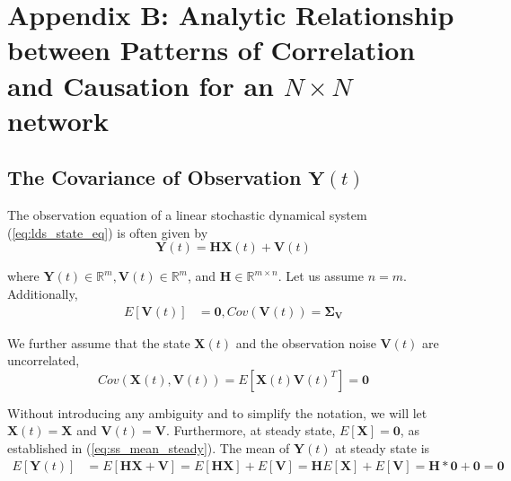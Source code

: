 \documentclass{article}
\begin{document}

\section*{Appendix B: Analytic Relationship between Patterns of Correlation and Causation for an $N \times N$ network}
\label{app:appB}
\renewcommand{\theequation}{B-\arabic{equation}}
\setcounter{equation}{0}

\subsection*{The Covariance of Observation $\mathbf{Y} (t)$}

The observation equation of a linear stochastic dynamical system (\ref{eq:lds_state_eq}) is often given by
\begin{equation}
\mathbf{Y}(t)=\mathbf{H}\mathbf{X}(t)+\mathbf{V}(t)
\label{eq:lds_obs_eq}
\end{equation}

where $\mathbf{Y}(t) \in \mathbb{R}^m, \mathbf{V}(t) \in \mathbb{R}^m$, and $\mathbf{H} \in \mathbb{R}^{m \times n}$. Let us assume $n=m$. Additionally,
\begin{equation}
\begin{aligned}
E[\mathbf{V}(t)]&=\mathbf{0},
Cov \left ( \mathbf{V}(t) \right )=\mathbf{\Sigma}_\mathbf{V}
\end{aligned}
\end{equation}

We further assume that the state $\mathbf{X}(t)$ and the observation noise $\mathbf{V}(t)$ are uncorrelated,
\begin{equation}
Cov \left ( \mathbf{X}(t), \mathbf{V}(t) \right ) = E \left[ \mathbf{X}(t) \mathbf{V}(t)^T \right] = \mathbf{0}
\label{eq:state_noise_uncorr}
\end{equation}

Without introducing any ambiguity and to simplify the notation, we will let $\mathbf{X}(t)=\mathbf{X}$ and $\mathbf{V}(t)=\mathbf{V}$. Furthermore, at steady state, $E[\mathbf{X}]=\mathbf{0}$, as established in (\ref{eq:ss_mean_steady}). The mean of $\mathbf{Y}(t)$ at steady state is
\begin{equation}
\begin{aligned}
E[\mathbf{Y}(t)] &=E \left[ \mathbf{H}\mathbf{X}+\mathbf{V} \right] =E \left[ \mathbf{H}\mathbf{X} \right ] + E \left [ \mathbf{V} \right]
=\mathbf{H} E \left[ \mathbf{X} \right ] + E \left [ \mathbf{V} \right]
=\mathbf{H} * \mathbf{0}+ \mathbf{0}=\mathbf{0}
\end{aligned}
\label{eq:mean_yt}
\end{equation}
\end{document}
